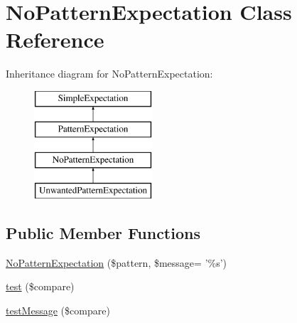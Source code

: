 \hypertarget{class_no_pattern_expectation}{
\section{NoPatternExpectation Class Reference}
\label{class_no_pattern_expectation}
}
Inheritance diagram for NoPatternExpectation:\begin{figure}[H]
\begin{center}
\leavevmode
\includegraphics[height=4.000000cm]{class_no_pattern_expectation}
\end{center}
\end{figure}
\subsection*{Public Member Functions}
\begin{DoxyCompactItemize}
\item 
\hyperlink{class_no_pattern_expectation_a01392fb76654440c039cc272fc752017}{NoPatternExpectation} (\$pattern, \$message= '\%s')
\item 
\hyperlink{class_no_pattern_expectation_adea22650021fb33f1d745aba552e6971}{test} (\$compare)
\item 
\hyperlink{class_no_pattern_expectation_a214eefe693fa189648ee4e51d38ed7b2}{testMessage} (\$compare)
\end{DoxyCompactItemize}


